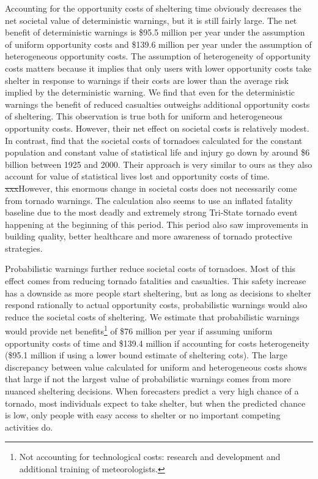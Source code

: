 \documentclass{ametsocV6.1}
\newcommand{\add}[1]{{\color{red}#1}}
\begin{document}
Accounting for the opportunity costs of sheltering time obviously decreases the net societal value of deterministic warnings, but it is still fairly large. The net benefit of deterministic warnings is \$95.5 million per year under the assumption of uniform opportunity costs and \$139.6 million per year under the assumption of heterogeneous opportunity costs. The assumption of heterogeneity of opportunity costs matters because it implies that only users with lower opportunity costs take shelter in response to warnings if their costs are lower than the average risk implied by the deterministic warning. We find that even for the deterministic warnings the benefit of reduced casualties outweighs additional opportunity costs of sheltering. This observation is true both for uniform and heterogeneous opportunity costs. However, their net effect on societal costs is relatively modest.  In contrast, \citet{simmons_economic_2013} find that the societal costs of tornadoes calculated for the constant population and constant value of statistical life and injury go down by around \$6 billion between 1925 and 2000. Their approach is very similar to ours as they also account for value of statistical lives lost and opportunity costs of time. \sout{xxx}\add{However, this enormous change in societal costs does not necessarily come from tornado warnings.} The calculation also seems to use an inflated fatality baseline due to the most deadly and extremely strong Tri-State tornado event happening at the beginning of this period. This period also saw improvements in building quality, better healthcare and more awareness of tornado protective strategies.

Probabilistic warnings further reduce societal costs of tornadoes. Most of this effect comes from reducing tornado fatalities and casualties. This safety increase has a downside as more people start sheltering, but as long as decisions to shelter respond rationally to actual opportunity costs, probabilistic warnings would also reduce the societal costs of sheltering. We estimate that probabilistic warnings would provide net benefits\footnote{Not accounting for technological costs: research and development and additional training of meteorologists.} of \$76 million per year if assuming uniform opportunity costs of time and \$139.4 million if accounting for costs heterogeneity (\$95.1 million if using a lower bound estimate of sheltering cots). The large discrepancy between value calculated for uniform and heterogeneous costs shows that large if not the largest value of probabilistic warnings comes from more nuanced sheltering decisions. When forecasters predict a very high chance of a tornado, most individuals expect to take shelter, but when the predicted chance is low, only people with easy access to shelter or no important competing activities do. 
\end{document}

